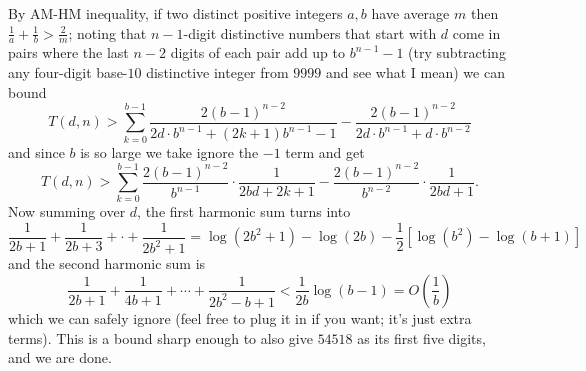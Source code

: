 \begin{solution}
    By AM-HM inequality, if two distinct positive integers $a, b$ have average $m$ then $\frac{1}{a} + \frac{1}{b} > \frac{2}{m}$; noting that $n - 1$-digit distinctive 
    numbers that start with $d$ come in pairs where the last $n - 2$ digits of each pair add up to $b^{n - 1} - 1$ (try subtracting any four-digit base-$10$ distinctive integer from $9999$ and see what I mean)
    we can bound $$T(d, n) > \sum_{k = 0}^{b - 1} \dfrac{2(b - 1)^{n - 2}}{2d \cdot b^{n - 1} + (2k + 1)b^{n - 1} - 1} - \dfrac{2(b - 1)^{n - 2}}{2d \cdot b^{n - 1} + d \cdot b^{n - 2}}$$
    and since $b$ is so large we take ignore the $-1$ term and get
    $$T(d, n) > \sum_{k = 0}^{b - 1} \dfrac{2(b - 1)^{n - 2}}{b^{n - 1}} \cdot \dfrac{1}{2bd + 2k + 1} - \dfrac{2(b - 1)^{n - 2}}{b^{n - 2}} \cdot \dfrac{1}{2bd + 1}.$$
    Now summing over $d$, the first harmonic sum turns into $$\dfrac{1}{2b + 1} + \dfrac{1}{2b + 3} + \cdot + \dfrac{1}{2b^2 + 1} = \log\left(2b^2 + 1\right) - \log(2b) - \dfrac{1}{2}\left[\log\left(b^2\right) - \log(b + 1)\right]$$
    and the second harmonic sum is $$\dfrac{1}{2b + 1} + \dfrac{1}{4b + 1} + \cdots + \dfrac{1}{2b^2 - b + 1} < \dfrac{1}{2b} \log(b - 1) = O\left(\dfrac{1}{b}\right)$$
    which we can safely ignore (feel free to plug it in if you want; it's just extra terms). This is a bound sharp enough to also give $\boxed{54518}$ as its first five digits, and we are done.
\end{solution}\bigskip
